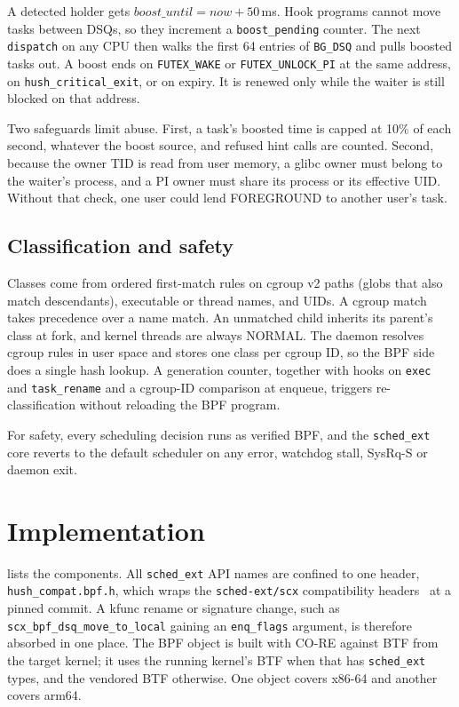 \documentclass[11pt,a4paper]{article}
\newcommand{\code}[1]{\texttt{#1}}
\begin{document}
A detected holder gets $\mathit{boost\_until}=\mathit{now}+50$\,ms. Hook
programs cannot move tasks between DSQs, so they increment a
\code{boost\_pending} counter. The next \code{dispatch} on any CPU then walks
the first 64 entries of \code{BG\_DSQ} and pulls boosted tasks out. A boost
ends on \code{FUTEX\_WAKE} or \code{FUTEX\_UNLOCK\_PI} at the same address, on
\code{hush\_critical\_exit}, or on expiry. It is renewed only while the
waiter is still blocked on that address.

Two safeguards limit abuse. First, a task's boosted time is capped at 10\% of
each second, whatever the boost source, and refused hint calls are counted.
Second, because the owner TID is read from user memory, a glibc owner must
belong to the waiter's process, and a PI owner must share its process or its
effective UID. Without that check, one user could lend FOREGROUND to another
user's task.

\subsection{Classification and safety}
Classes come from ordered first-match rules on cgroup v2 paths (globs that
also match descendants), executable or thread names, and UIDs. A cgroup match
takes precedence over a name match. An unmatched child inherits its parent's
class at fork, and kernel threads are always NORMAL. The daemon resolves
cgroup rules in user space and stores one class per cgroup ID, so the BPF side
does a single hash lookup. A generation counter, together with hooks on
\code{exec} and \code{task\_rename} and a cgroup-ID comparison at enqueue,
triggers re-classification without reloading the BPF program.

For safety, every scheduling decision runs as verified BPF, and the
\code{sched\_ext} core reverts to the default scheduler on any error,
watchdog stall, SysRq-S or daemon exit.

\section{Implementation}
\label{sec:impl}

 lists the components. All \code{sched\_ext} API names
are confined to one header, \code{hush\_compat.bpf.h}, which wraps the
\code{sched-ext/scx} compatibility headers~\cite{scx-project} at a pinned
commit. A kfunc rename or signature change, such as
\code{scx\_bpf\_dsq\_move\_to\_local} gaining an \code{enq\_flags} argument,
is therefore absorbed in one place. The BPF object is built with CO-RE
against BTF from the target kernel; it uses the running kernel's BTF when that
has \code{sched\_ext} types, and the vendored BTF otherwise. One object covers
x86-64 and another covers arm64.
\end{document}
